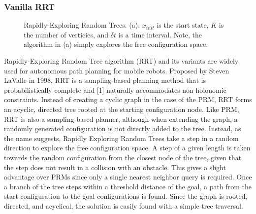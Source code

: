 \documentclass[12pt]{article}
\begin{document}
        \subsubsection{Vanilla RRT}
        \begin{figure}[ht]
            \quad
            \caption{Rapidly-Exploring Random Trees. (a): $x_{init}$ is the start state, $K$ is the number of verticies, and $\delta t$ is a time interval. Note, the algorithm in (a) simply explores the free configuration space.}
            \label{fig:rrt}
        \end{figure}
            \par  Rapidly-Exploring Random Tree algorithm (RRT) and its variants are widely used for autonomous path planning for mobile robots. Proposed by Steven LaValle in 1998, RRT is a sampling-based planning method that is probabilistically complete and [1] naturally accommodates non-holonomic constraints. Instead of creating a cyclic graph in the case of the PRM, RRT forms an acyclic, directed tree rooted at the starting configuration node. Like PRM, RRT is also a sampling-based planner, although when extending the graph, a randomly generated configuration is not directly added to the tree. Instead, as the name suggests, Rapidly Exploring Random Trees take a step in a random direction to explore the free configuration space. A step of a given length is taken towards the random configuration from the closest node of the tree, given that the step does not result in a collision with an obstacle. This gives a slight advantage over PRMs since only a single nearest neighbor query is required. Once a branch of the tree steps within a threshold distance of the goal, a path from the start configuration to the goal configurations is found. Since the graph is rooted, directed, and acyclical, the solution is easily found with a simple tree traversal. 
\end{document}
